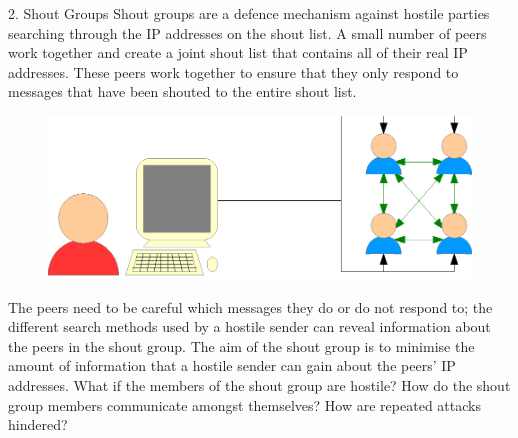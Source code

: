 \documentclass[ %
                    author={Luke Murray},
                supervisor={Dr. Simon Hollis},
                     title={Shadow Peer-to-Peer Networks},
                  subtitle={},
                    degree={MEng},
                      year={2013} ]{poster}
\begin{document}
\begin{frame}{}
\begin{columns}[t]
    \begin{column}{0.422\linewidth}
    \begin{block}{\normalsize 2. Shout Groups}
    \small Shout groups are a defence mechanism against hostile parties searching through the IP addresses on the shout list. A small number of peers work together and create a joint shout list that contains all of their real IP addresses. These peers work together to ensure that they only respond to messages that have been shouted to the entire shout list.
    \begin{figure}[h]
        \includegraphics{diagrams/poster_d3.eps}
    \end{figure}
    The peers need to be careful which messages they do or do not respond to; the different search methods used by a hostile sender can reveal information about the peers in the shout group. The aim of the shout group is to minimise the amount of information that a hostile sender can gain about the peers' IP addresses. What if the members of the shout group are hostile? How do the shout group members communicate amongst themselves? How are repeated attacks hindered?
    \end{block}
    \end{column}
\end{columns}

\vfill


\end{frame}
\end{document}
